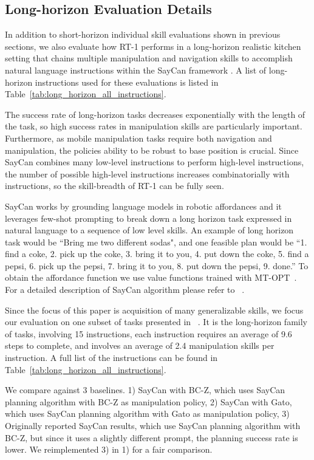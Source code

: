 \documentclass{article} %
\newcommand{\algname}{RT-1\xspace}
\begin{document}
\subsection{Long-horizon Evaluation Details}
\label{sec:app_exp_long}

In addition to short-horizon individual skill evaluations shown in previous sections, we also evaluate how RT-1 performs in a long-horizon realistic kitchen setting that chains multiple manipulation and navigation skills to accomplish natural language instructions within the SayCan framework \citep{ahn2022can}.
A list of long-horizon instructions used for these evaluations is listed in  Table~\ref{tab:long_horizon_all_instructions}.

The success rate of long-horizon tasks decreases exponentially with the length of the task, so high success rates in manipulation skills are particularly important. Furthermore, as mobile manipulation tasks require both navigation and manipulation, the policies ability to be robust to base position is crucial.
Since SayCan combines many low-level instructions to perform high-level instructions, the number of possible high-level instructions increases combinatorially with instructions, so the skill-breadth of \algname can be fully seen.

SayCan works by grounding language models in robotic affordances and it leverages few-shot prompting to break down a long horizon task expressed in natural language to a sequence of low level skills. An example of long horizon task would be ``Bring me two different sodas", and one feasible plan would be ``1. find a coke, 2. pick up the coke, 3. bring it to you, 4. put down the coke, 5. find a pepsi, 6. pick up the pepsi, 7. bring it to you, 8. put down the pepsi, 9. done.'' To obtain the affordance function we use value functions trained with MT-OPT~\citep{kalashnikov2021mt}. For a detailed description of SayCan algorithm please refer to ~\citep{ahn2022can}.

Since the focus of this paper is acquisition of many generalizable skills, we focus our evaluation on one subset of tasks presented in ~\cite{ahn2022can}. It is the long-horizon family of tasks, involving 15 instructions, each instruction requires an average of 9.6 steps to complete, and involves an average of 2.4 manipulation skills per instruction. A full list of the instructions can be found in Table~\ref{tab:long_horizon_all_instructions}.

We compare against 3 baselines. 1) SayCan with BC-Z, which uses SayCan planning algorithm with BC-Z as manipulation policy, 2) SayCan with Gato, which uses SayCan planning algorithm with Gato as manipulation policy, 3) Originally reported SayCan results, which use SayCan planning algorithm with BC-Z, but since it uses a slightly different prompt, the planning success rate is lower. We reimplemented 3) in 1) for a fair comparison. 
\end{document}
